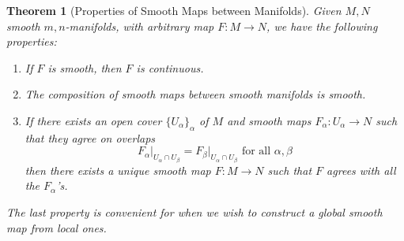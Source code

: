 \documentclass{article}
\newtheorem{theorem}{Theorem}[section]
\theoremstyle{remark}
\theoremstyle{definition}
\begin{document}
\begin{theorem}[Properties of Smooth Maps between Manifolds]
Given $M, N$ smooth $m, n$-manifolds, with arbitrary map $F: M \longrightarrow N$, we have the following properties: 
\begin{enumerate}
    \item If $F$ is smooth, then $F$ is continuous. 
    \item The composition of smooth maps between smooth manifolds is smooth. 
    \item If there exists an open cover $\{U_\alpha\}_\alpha$ of $M$ and smooth maps $F_\alpha: U_\alpha \longrightarrow N$ such that they agree on overlaps
    \[F_\alpha \big|_{U_\alpha \cap U_\beta} = F_\beta \big|_{U_\alpha \cap U_\beta} \text{ for all } \alpha, \beta\]
    then there exists a unique smooth map $F: M \longrightarrow N$ such that $F$ agrees with all the $F_\alpha$'s. 
\end{enumerate}
The last property is convenient for when we wish to construct a global smooth map from local ones. 
\end{theorem}
\end{document}
